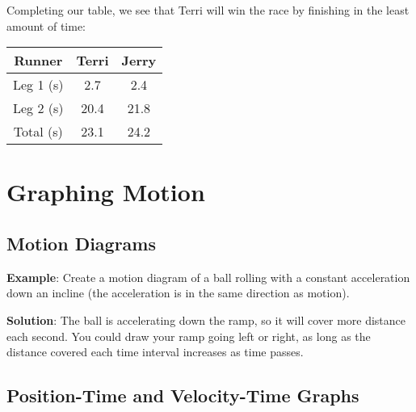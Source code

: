 Completing our table, we see that Terri will win the race by finishing in the 
least amount of time:
\begin{center}
\begin{tabular}{|c|c|c|}
\hline
Runner & Terri & Jerry\\\hline
Leg 1 (s) & 2.7 & 2.4 \\\hline
Leg 2 (s) & 20.4 & 21.8 \\\hline
Total (s) & 23.1 & 24.2 \\\hline
\end{tabular}
\end{center}

\section{Graphing Motion}

\subsection{Motion Diagrams}

\textbf{Example}: Create a motion diagram of a ball rolling with a constant 
acceleration down an incline (the acceleration is in the same direction as 
motion). 

\textbf{Solution}: The ball is accelerating down the ramp, so it will cover 
more distance each second. You could draw your ramp going left or right, as 
long as the distance covered each time interval increases as time passes. 

\begin{center}
\end{center}

\subsection{Position-Time and Velocity-Time Graphs}

